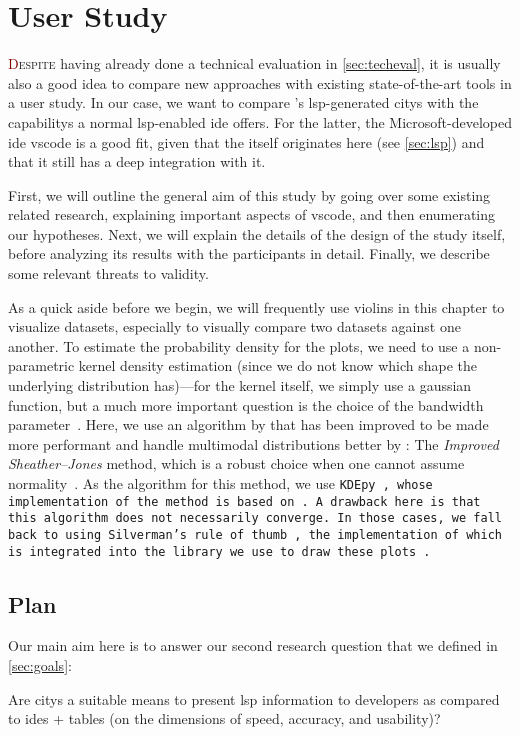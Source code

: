 \documentclass[../thesis]{subfiles}
\begin{document}
\chapter{User Study}\label{ch:evaluation}

\lettrine[lines=3]{\textcolor{Maroon}{D}}{espite} having already done a technical evaluation in \cref{sec:techeval}, it is usually also a good idea to compare new approaches with existing state-of-the-art tools in a user study.
In our case, we want to compare \SEE{}'s \gls{lsp}-generated \glspl{city} with the \glspl{capability} a normal \gls{lsp}-enabled \gls{ide} offers.
For the latter, the Microsoft-developed \gls{ide} \gls{vscode} is a good fit, given that the  itself originates here (see \cref{sec:lsp}) and that it still has a deep integration with it.

First, we will outline the general aim of this study by going over some existing related research, explaining important aspects of \gls{vscode}, and then enumerating our hypotheses.
Next, we will explain the details of the design of the study itself, before analyzing its results with the \participants{} participants in detail.
Finally, we describe some relevant threats to validity.

As a quick aside before we begin, we will frequently use \glspl{violin} in this chapter to visualize datasets, especially to visually compare two datasets against one another.
To estimate the probability density for the plots, we need to use a non-parametric kernel density estimation (since we do not know which shape the underlying distribution has)---for the kernel itself, we simply use a gaussian function, but a much more important question is the choice of the bandwidth parameter~\cite{heidenreich2013}.
Here, we use an algorithm by \textcite{sheather1991} that has been improved to be made more performant and handle multimodal distributions better by \textcite{botev2010a}:
The \emph{Improved Sheather--Jones} method, which is a robust choice when one cannot assume normality~\cite{akinshin2020}.
As the algorithm for this method, we use \tt{KDEpy}~\cite{odland2018}, whose implementation of the method is based on \textcite[326--328]{kroese2011}.
A drawback here is that this algorithm does not necessarily converge.
In those cases, we fall back to using Silverman's rule of thumb~\cite{silverman1986}, the implementation of which is integrated into the library we use to draw these plots~\cite{callil-soares2024}.

\section{Plan}  %
Our main aim here is to answer our second research question that we defined in \cref{sec:goals}:
\begin{displayquote}
	Are \glspl{city} a suitable means to present \gls{lsp} information to developers as compared to \glspl{ide} + tables (on the dimensions of speed, accuracy, and usability)?
\end{displayquote}
\end{document}
